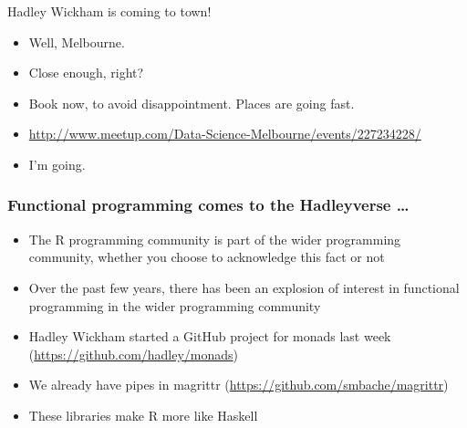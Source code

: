 \documentclass{beamer}
\begin{document}
\begin{frame}{Hadley Wickham is coming to town!}
\begin{itemize}
\item Well, Melbourne.
\item Close enough, right?
\item Book now, to avoid disappointment. Places are going fast.
\item \url{http://www.meetup.com/Data-Science-Melbourne/events/227234228/}
\item I'm going.
\end{itemize}
\end{frame}

\begin{frame}
\frametitle{Functional programming comes to the Hadleyverse \ldots}
\begin{itemize}
\item The R programming community is part of the wider programming community, whether you choose to
			acknowledge this fact or not
\item Over the past few years, there has been an explosion of interest in functional programming in the wider
			programming community
\item Hadley Wickham started a GitHub project for monads last week (\url{https://github.com/hadley/monads})
\item We already have pipes in magrittr (\url{https://github.com/smbache/magrittr})
\item These libraries make R more like Haskell
\end{itemize}
\end{frame}
\end{document}
